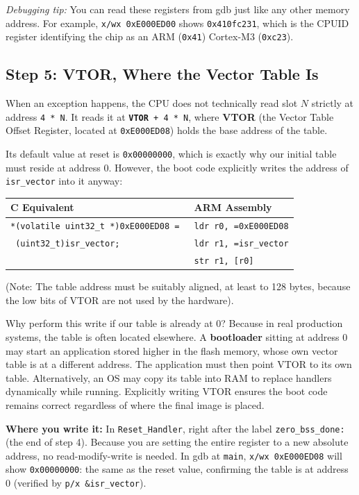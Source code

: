 \textit{Debugging tip:} You can read these registers from gdb just like any other memory address. For example, \texttt{x/wx 0xE000ED00} shows \texttt{0x410fc231}, which is the CPUID register identifying the chip as an ARM (\texttt{0x41}) Cortex-M3 (\texttt{0xc23}).

\subsection{Step 5: VTOR, Where the Vector Table Is}
When an exception happens, the CPU does not technically read slot $N$ strictly at address \texttt{4 * N}. It reads it at \texttt{\textbf{VTOR} + 4 * N}, where \textbf{VTOR} (the Vector Table Offset Register, located at \texttt{0xE000ED08}) holds the base address of the table. 

Its default value at reset is \texttt{0x00000000}, which is exactly why our initial table must reside at address 0. However, the boot code explicitly writes the address of \texttt{isr\_vector} into it anyway:

\begin{table}[h!]
\centering
\begin{tabular}{|l|l|}
\hline
\textbf{C Equivalent} & \textbf{ARM Assembly} \\ \hline
\texttt{*(volatile uint32\_t *)0xE000ED08 = } & \texttt{ldr r0, =0xE000ED08} \\
\texttt{                       (uint32\_t)isr\_vector;} & \texttt{ldr r1, =isr\_vector} \\
& \texttt{str r1, [r0]} \\ \hline
\end{tabular}
\end{table}

(Note: The table address must be suitably aligned, at least to 128 bytes, because the low bits of VTOR are not used by the hardware).

Why perform this write if our table is already at 0? Because in real production systems, the table is often located elsewhere. A \textbf{bootloader} sitting at address 0 may start an application stored higher in the flash memory, whose own vector table is at a different address. The application must then point VTOR to its own table. Alternatively, an OS may copy its table into RAM to replace handlers dynamically while running. Explicitly writing VTOR ensures the boot code remains correct regardless of where the final image is placed.

\textbf{Where you write it:} In \texttt{Reset\_Handler}, right after the label \texttt{zero\_bss\_done:} (the end of step 4). Because you are setting the entire register to a new absolute address, no read-modify-write is needed. In gdb at \texttt{main}, \texttt{x/wx 0xE000ED08} will show \texttt{0x00000000}: the same as the reset value, confirming the table is at address 0 (verified by \texttt{p/x \&isr\_vector}).

